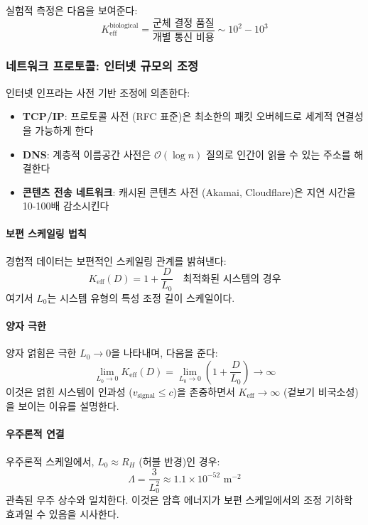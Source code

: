 \documentclass[11pt,a4paper]{article}
\begin{document}
	실험적 측정은 다음을 보여준다:
	\begin{equation}
		K_{\mathrm{eff}}^{\text{biological}} = \frac{\text{군체 결정 품질}}{\text{개별 통신 비용}} \sim 10^2 - 10^3
	\end{equation}
	
	\subsubsection{네트워크 프로토콜: 인터넷 규모의 조정}
	인터넷 인프라는 사전 기반 조정에 의존한다:
	\begin{itemize}
		\item \textbf{TCP/IP}: 프로토콜 사전 (RFC 표준)은 최소한의 패킷 오버헤드로 세계적 연결성을 가능하게 한다
		\item \textbf{DNS}: 계층적 이름공간 사전은 $\mathcal{O}(\log n)$ 질의로 인간이 읽을 수 있는 주소를 해결한다
		\item \textbf{콘텐츠 전송 네트워크}: 캐시된 콘텐츠 사전 (Akamai, Cloudflare)은 지연 시간을 10-100배 감소시킨다
	\end{itemize}
	
	\paragraph{보편 스케일링 법칙}
	경험적 데이터는 보편적인 스케일링 관계를 밝혀낸다:
	\begin{equation}
		\boxed{K_{\mathrm{eff}}(D) = 1 + \frac{D}{L_0} \quad \text{최적화된 시스템의 경우}}
	\end{equation}
	여기서 $L_0$는 시스템 유형의 특성 조정 길이 스케일이다.
	
	\paragraph{양자 극한}
	양자 얽힘은 극한 $L_0 \to 0$을 나타내며, 다음을 준다:
	\begin{equation}
		\lim_{L_0 \to 0} K_{\mathrm{eff}}(D) = \lim_{L_0 \to 0} \left(1 + \frac{D}{L_0}\right) \to \infty
	\end{equation}
	이것은 얽힌 시스템이 인과성 ($v_{\text{signal}} \leq c$)을 존중하면서 $K_{\mathrm{eff}} \to \infty$ (겉보기 비국소성)을 보이는 이유를 설명한다.
	
	\paragraph{우주론적 연결}
	우주론적 스케일에서, $L_0 \approx R_H$ (허블 반경)인 경우:
	\begin{equation}
		\Lambda = \frac{3}{L_0^2} \approx 1.1 \times 10^{-52} \text{ m}^{-2}
	\end{equation}
	관측된 우주 상수와 일치한다. 이것은 암흑 에너지가 보편 스케일에서의 조정 기하학 효과일 수 있음을 시사한다.
	
\end{document}
